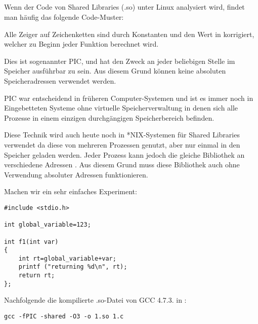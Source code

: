 \subsection{\CapitalPICcode}
\myindex{\PICcode}
\label{sec:PIC}

Wenn der Code von Shared Libraries (.so) unter Linux analysiert wird, findet
man häufig das folgende Code-Muster:



Alle Zeiger auf Zeichenketten sind durch Konstanten und den Wert in \EBX korrigiert,
welcher zu Beginn jeder Funktion berechnet wird.

Dies ist sogenannter \ac{PIC}, und hat den Zweck an jeder beliebigen Stelle im Speicher
ausführbar zu sein. Aus diesem Grund können keine absoluten Speicheradressen verwendet werden.

\ac{PIC} war entscheidend in früheren Computer-Systemen und ist es immer noch in Eingebetteten
Systeme ohne virtuelle Speicherverwaltung in denen sich alle Prozesse in einem einzigen durchgängigen
Speicherbereich befinden.

Diese Technik wird auch heute noch in *NIX-Systemen für Shared Libraries verwendet
da diese von mehreren Prozessen genutzt, aber nur einmal in den Speicher geladen werden.
Jeder Prozess kann jedoch die gleiche Bibliothek an verschiedene Adressen .
Aus diesem Grund muss diese Bibliothek auch ohne Verwendung absoluter Adressen funktionieren.

Machen wir ein sehr einfaches Experiment:

\begin{lstlisting}
#include <stdio.h>

int global_variable=123;

int f1(int var)
{
    int rt=global_variable+var;
    printf ("returning %d\n", rt);
    return rt;
};
\end{lstlisting}

Nachfolgende die kompilierte .so-Datei von GCC 4.7.3. in \IDA:

\begin{lstlisting}
gcc -fPIC -shared -O3 -o 1.so 1.c
\end{lstlisting}



\newcommand{\retstring}{\emph{<<returning \%d\textbackslash{}n>>}}
\newcommand{\globvar}{\emph{global\_variable}}

